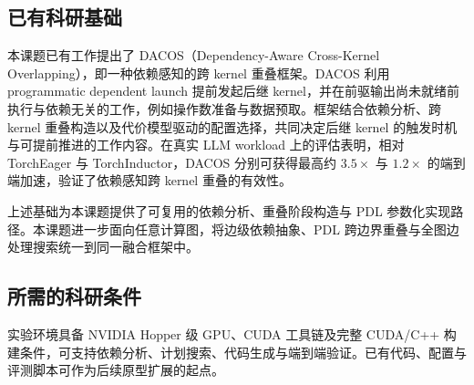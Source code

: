 \subsection{已有科研基础}

本课题已有工作提出了 DACOS（Dependency-Aware Cross-Kernel Overlapping），即一种依赖感知的跨 kernel 重叠框架\cite{hao2026dacos}。DACOS 利用 programmatic dependent launch 提前发起后继 kernel，并在前驱输出尚未就绪前执行与依赖无关的工作，例如操作数准备与数据预取。框架结合依赖分析、跨 kernel 重叠构造以及代价模型驱动的配置选择，共同决定后继 kernel 的触发时机与可提前推进的工作内容。在真实 LLM workload 上的评估表明，相对 TorchEager 与 TorchInductor，DACOS 分别可获得最高约 $3.5\times$ 与 $1.2\times$ 的端到端加速，验证了依赖感知跨 kernel 重叠的有效性。

上述基础为本课题提供了可复用的依赖分析、重叠阶段构造与 PDL 参数化实现路径。本课题进一步面向任意计算图，将边级依赖抽象、PDL 跨边界重叠与全图边处理搜索统一到同一融合框架中。

\subsection{所需的科研条件}

实验环境具备 NVIDIA Hopper 级 GPU、CUDA 工具链及完整 CUDA/C++ 构建条件，可支持依赖分析、计划搜索、代码生成与端到端验证。已有代码、配置与评测脚本可作为后续原型扩展的起点。
